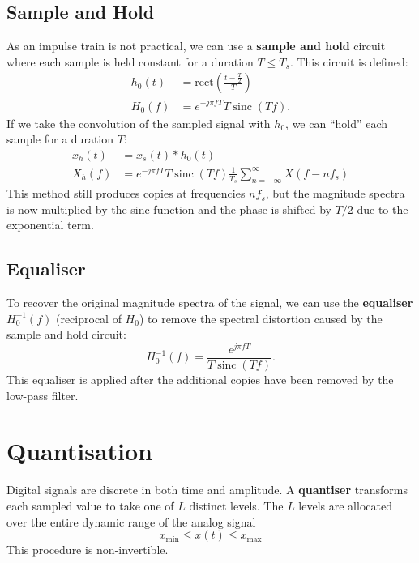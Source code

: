 \documentclass{article}
\DeclareMathOperator{\sinc}{sinc}
\begin{document}
\subsection{Sample and Hold}
As an impulse train is not practical, we can use a \textbf{sample and
hold} circuit where each sample is held constant for a duration \(T
\leq T_s\). This circuit is defined:
\begin{align*}
    h_0\left( t \right) & = \mathrm{rect}\left( \frac{t - \frac{T}{2}}{T} \right) \\
    H_0\left( f \right) & = e^{-j \pi f T} T \sinc{\left( T f \right)}.
\end{align*}
If we take the convolution of the sampled signal with \(h_0\), we can ``hold'' each sample for a duration \(T\):
\begin{align*}
    x_h\left( t \right) & = x_s\left( t \right) * h_0\left( t \right)                                                                   \\
    X_h\left( f \right) & = e^{-j \pi f T} T \sinc{\left( T f \right)} \frac{1}{T_s} \sum_{n = -\infty}^\infty X\left( f - nf_s \right)
\end{align*}
This method still produces copies at frequencies \(n f_s\), but
the magnitude spectra is now multiplied by the sinc function and the phase is shifted by \(T/2\) due to the exponential term.
\subsection{Equaliser}
To recover the original magnitude spectra of the signal, we can use the
\textbf{equaliser} \(H_0^{-1}\left( f \right)\) (reciprocal of \(H_0\))
to remove the spectral distortion caused by the sample and hold
circuit:
\begin{equation*}
    H_0^{-1}\left( f \right) = \frac{e^{j \pi f T}}{T \sinc{\left( T f \right)}}.
\end{equation*}
This equaliser is applied after the additional copies have been removed by the low-pass filter.
\section{Quantisation}
Digital signals are discrete in both time and amplitude. A
\textbf{quantiser} transforms each sampled value to take one of \(L\)
distinct levels. The \(L\) levels are allocated over the entire dynamic
range of the analog signal
\begin{equation*}
    x_\mathrm{min} \leq x\left( t \right) \leq x_\mathrm{max}
\end{equation*}
This procedure is non-invertible.
\end{document}
